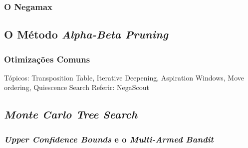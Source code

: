 \documentclass[12pt,a4paper,oneside]{article}
\begin{document}


\subsubsection{O Negamax}

\lipsum[1]

\lipsum[2]

\subsection{O Método \textit{Alpha-Beta Pruning}}

\lipsum[1]

\lipsum[2]

\lipsum[3]

\lipsum[4]

\lipsum[5]

\lipsum[6]

\subsubsection{Otimizações Comuns}


Tópicos: Transposition Table, Iterative Deepening, Aspiration Windows, Move ordering, Quiescence Search
Referir: NegaScout

\lipsum[1]

\lipsum[2]

\lipsum[3]

\lipsum[4]

\lipsum[5]

\subsection{\textit{Monte Carlo Tree Search}}

\lipsum[1]

\lipsum[2]

\lipsum[3]

\subsubsection{\textit{Upper Confidence Bounds} e o \textit{Multi-Armed Bandit}}

\lipsum[1]

\lipsum[2]
\end{document}
